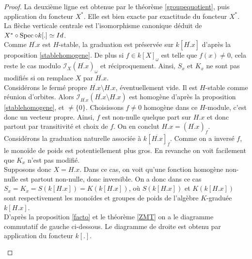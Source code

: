 \begin{proof}
La deuxième ligne est obtenue par le théorème \ref{groupequotient}, puis application du foncteur $X^*$. Elle est bien exacte par exactitude du foncteur $X^*$. La flèche verticale centrale est l'isomorphisme canonique déduit de $X^*\circ\operatorname{Spec}\circ k[.]\simeq Id$.\\ 
Comme $\overline{H.x}$ est $H$-stable, la graduation est préservée sur $k[\overline{H.x}]$ d'après la proposition \ref{stablehomogene}. De plus si $f\in k[X]_{\omega}$ est telle que $f(x)\neq 0$, cela reste le cas modulo $\mathcal{I}_{X}(\overline{H.x})_\omega$ et réciproquement. Ainsi, $S_x$ et $K_x$ ne sont pas modifiés si on remplace $X$ par $\overline{H.x}$. \\
Considérons le fermé propre $\overline{H.x}\setminus H.x$, éventuellement vide. Il est $H$-stable comme réunion d'orbites. Alors $\mathcal{I}_{\overline{H.x}}(\overline{H.x}\setminus H.x)$ est homogène d'après la proposition \ref{stablehomogene}, et $\neq \lbrace 0\rbrace$. Choisissons $f\neq0$ homogène dans ce $H$-module, c'est donc un vecteur propre. Ainsi, $f$ est non-nulle quelque part sur $H.x$ et donc partout par transitivité et choix de $f$. On en conclut $H.x=(\overline{H.x})_f$. Considérons la graduation naturelle associée à $k[\overline{H.x}]_f$. Comme on a inversé $f$, le monoïde de poids est potentiellement plus gros. En revanche on voit facilement que $K_x$ n'est pas modifié.\\
Supposons donc $X=H.x$. Dans ce cas, on voit qu'une fonction homogène non-nulle est partout non-nulle, donc inversible. On a donc dans ce cas $S_x=K_x=S(k[H.x])=K(k[H.x])$, où $S(k[H.x])$ et $K(k[H.x])$ sont respectivement les monoïdes et groupes de poids de l'algèbre $K$-graduée $k[H.x]$. \\
D'après la proposition \ref{facto} et le théorème \ref{ZMT} on a le diagramme commutatif de gauche ci-dessous. Le diagramme de droite est obtenu par application du foncteur $k[.]$.
\begin{multicols}{2}
	\begin{center}
	\end{center}


\end{multicols}
\end{proof}
